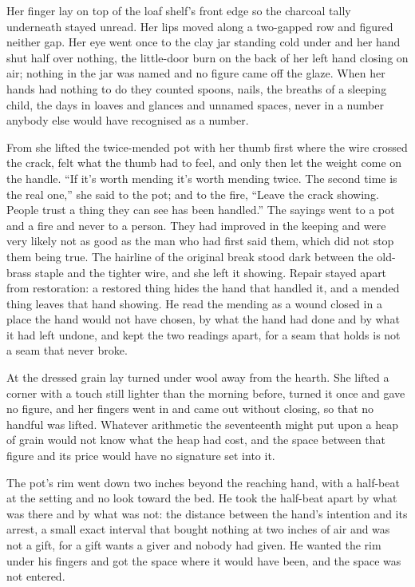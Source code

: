 Her finger lay on top of the loaf shelf's front edge so the charcoal tally underneath stayed unread. Her lips moved along a two-gapped row and figured neither gap. Her eye went once to the clay jar standing cold under  and her hand shut half over nothing, the little-door burn on the back of her left hand closing on air; nothing in the jar was named and no figure came off the glaze. When her hands had nothing to do they counted spoons, nails, the breaths of a sleeping child, the days in loaves and glances and unnamed spaces, never in a number anybody else would have recognised as a number.

From  she lifted the twice-mended pot with her thumb first where the wire crossed the crack, felt what the thumb had to feel, and only then let the weight come on the handle. “If it's worth mending it's worth mending twice. The second time is the real one,” she said to the pot; and to the fire, “Leave the crack showing. People trust a thing they can see has been handled.” The sayings went to a pot and a fire and never to a person. They had improved in the keeping and were very likely not as good as the man who had first said them, which did not stop them being true. The hairline of the original break stood dark between the old-brass staple and the tighter wire, and she left it showing. Repair stayed apart from restoration: a restored thing hides the hand that handled it, and a mended thing leaves that hand showing. He read the mending as a wound closed in a place the hand would not have chosen, by what the hand had done and by what it had left undone, and kept the two readings apart, for a seam that holds is not a seam that never broke.

At  the dressed grain lay turned under wool away from the hearth. She lifted a corner with a touch still lighter than the morning before, turned it once and gave no figure, and her fingers went in and came out without closing, so that no handful was lifted. Whatever arithmetic the seventeenth might put upon a heap of grain would not know what the heap had cost, and the space between that figure and its price would have no signature set into it.

The pot's rim went down two inches beyond the reaching hand, with a half-beat at the setting and no look toward the bed. He took the half-beat apart by what was there and by what was not: the distance between the hand's intention and its arrest, a small exact interval that bought nothing at two inches of air and was not a gift, for a gift wants a giver and nobody had given. He wanted the rim under his fingers and got the space where it would have been, and the space was not entered.

